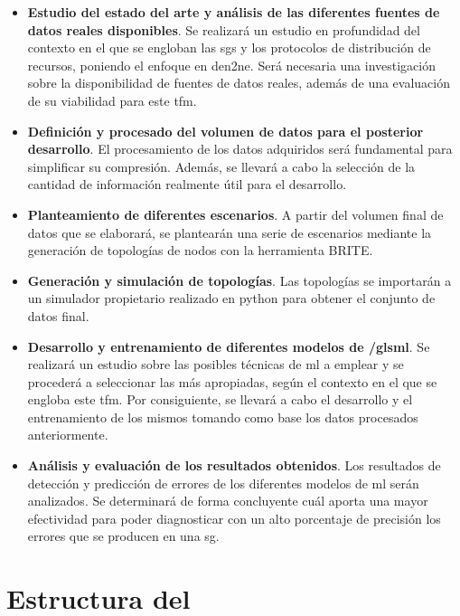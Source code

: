 \begin{itemize}
    \item \textbf{Estudio del estado del arte y análisis de las diferentes fuentes de datos reales disponibles}. Se realizará un estudio en profundidad del contexto en el que se engloban las \gls{sgs} y los protocolos de distribución de recursos, poniendo el enfoque en  \gls{den2ne}. Será necesaria una investigación sobre la disponibilidad de  fuentes de datos reales, además de una evaluación de su viabilidad para este \gls{tfm}.
    
    \item \textbf{Definición y procesado del volumen de datos para el posterior desarrollo}. El procesamiento de los datos adquiridos será fundamental para simplificar su compresión. Además, se llevará a cabo la selección de la cantidad de información realmente útil para el desarrollo.    

    \item \textbf{Planteamiento de diferentes escenarios}. A partir del volumen final de datos que se elaborará, se plantearán una serie de escenarios mediante la generación de topologías de nodos con la herramienta BRITE. %
    
    \item \textbf{Generación y simulación de topologías}. Las topologías se importarán a un simulador propietario realizado en python para obtener el conjunto de datos final.
    
    \item \textbf{Desarrollo y entrenamiento de diferentes modelos de /gls{ml}}. Se realizará un estudio sobre las posibles técnicas de \gls{ml} a emplear y se procederá a seleccionar las más apropiadas, según el contexto en el que se engloba este \gls{tfm}. Por consiguiente, se llevará a cabo el desarrollo y el entrenamiento de los mismos tomando como base los datos procesados anteriormente. 
    
    \item \textbf{Análisis y evaluación de los resultados obtenidos}. Los resultados de detección y predicción de errores de los diferentes modelos de \gls{ml} serán analizados. Se determinará de forma concluyente cuál aporta una mayor efectividad para poder diagnosticar con un alto porcentaje de precisión los errores que se producen en una \gls{sg}.
    
\end{itemize}


\section{Estructura del }
\label{sec:structure}



